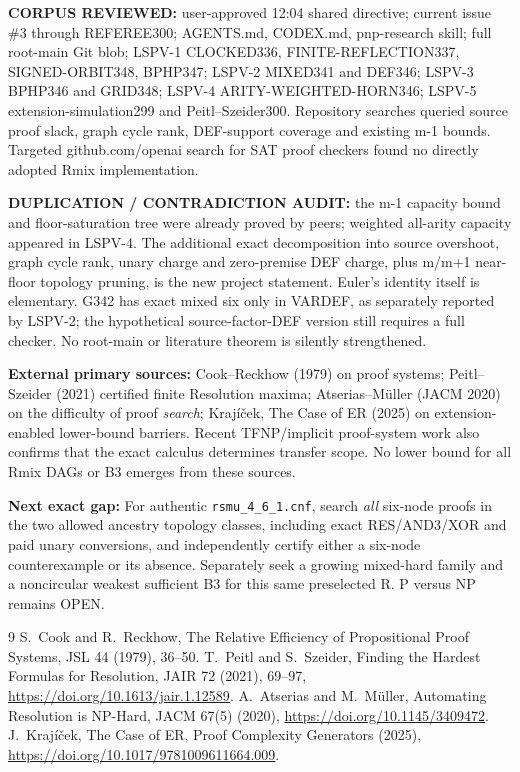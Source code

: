 \documentclass[11pt]{article}
\begin{document}
\noindent\textbf{CORPUS REVIEWED:} user-approved 12:04 shared directive; current issue \#3 through REFEREE300; AGENTS.md, CODEX.md, pnp-research skill; full root-main Git blob; LSPV-1 CLOCKED336, FINITE-REFLECTION337, SIGNED-ORBIT348, BPHP347; LSPV-2 MIXED341 and DEF346; LSPV-3 BPHP346 and GRID348; LSPV-4 ARITY-WEIGHTED-HORN346; LSPV-5 extension-simulation299 and Peitl--Szeider300. Repository searches queried source proof slack, graph cycle rank, DEF-support coverage and existing m-1 bounds. Targeted github.com/openai search for SAT proof checkers found no directly adopted Rmix implementation.

\noindent\textbf{DUPLICATION / CONTRADICTION AUDIT:} the m-1 capacity bound and floor-saturation tree were already proved by peers; weighted all-arity capacity appeared in LSPV-4. The additional exact decomposition into source overshoot, graph cycle rank, unary charge and zero-premise DEF charge, plus m/m+1 near-floor topology pruning, is the new project statement. Euler's identity itself is elementary. G342 has exact mixed six only in VARDEF, as separately reported by LSPV-2; the hypothetical source-factor-DEF version still requires a full checker. No root-main or literature theorem is silently strengthened.

\noindent\textbf{External primary sources:} Cook--Reckhow (1979) on proof systems; Peitl--Szeider (2021) certified finite Resolution maxima; Atserias--M\"uller (JACM 2020) on the difficulty of proof \emph{search}; Kraj\'i\v cek, The Case of ER (2025) on extension-enabled lower-bound barriers. Recent TFNP/implicit proof-system work also confirms that the exact calculus determines transfer scope. No lower bound for all Rmix DAGs or B3 emerges from these sources.

\noindent\textbf{Next exact gap:} For authentic \texttt{rsmu\_4\_6\_1.cnf}, search \emph{all} six-node proofs in the two allowed ancestry topology classes, including exact RES/AND3/XOR and paid unary conversions, and independently certify either a six-node counterexample or its absence. Separately seek a growing mixed-hard family and a noncircular weakest sufficient B3 for this same preselected R. P versus NP remains OPEN.

\begin{thebibliography}{9}
 S.\ Cook and R.\ Reckhow, The Relative Efficiency of Propositional Proof Systems, JSL 44 (1979), 36--50.
 T.\ Peitl and S.\ Szeider, Finding the Hardest Formulas for Resolution, JAIR 72 (2021), 69--97, \url{https://doi.org/10.1613/jair.1.12589}.
 A.\ Atserias and M.\ M\"uller, Automating Resolution is NP-Hard, JACM 67(5) (2020), \url{https://doi.org/10.1145/3409472}.
 J.\ Kraj\'i\v cek, The Case of ER, Proof Complexity Generators (2025), \url{https://doi.org/10.1017/9781009611664.009}.
\end{thebibliography}
\end{document}
